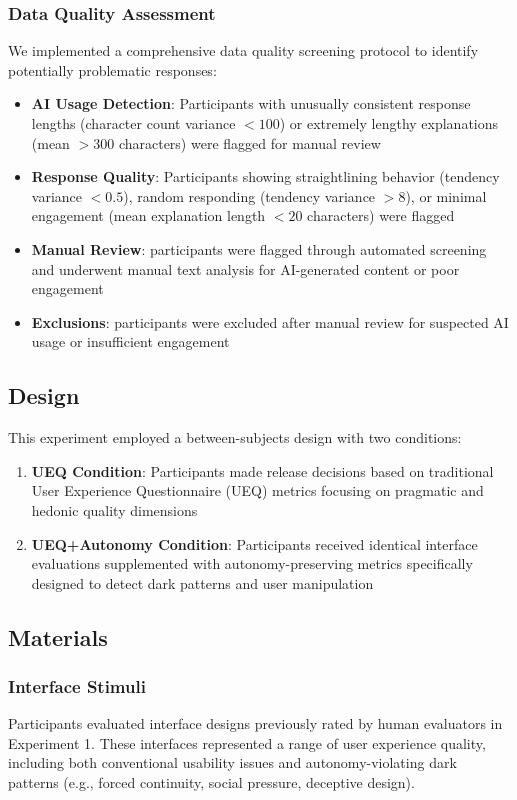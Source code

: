 \subsubsection{Data Quality Assessment}
We implemented a comprehensive data quality screening protocol to identify potentially problematic responses:

\begin{itemize}
    \item \textbf{AI Usage Detection}: Participants with unusually consistent response lengths (character count variance $< 100$) or extremely lengthy explanations (mean $> 300$ characters) were flagged for manual review
    \item \textbf{Response Quality}: Participants showing straightlining behavior (tendency variance $< 0.5$), random responding (tendency variance $> 8$), or minimal engagement (mean explanation length $< 20$ characters) were flagged
    \item \textbf{Manual Review}: \texttt{} participants were flagged through automated screening and underwent manual text analysis for AI-generated content or poor engagement
    \item \textbf{Exclusions}: \texttt{} participants were excluded after manual review for suspected AI usage or insufficient engagement
\end{itemize}

\subsection{Design}
This experiment employed a between-subjects design with two conditions:
\begin{enumerate}
    \item \textbf{UEQ Condition}: Participants made release decisions based on traditional User Experience Questionnaire (UEQ) metrics focusing on pragmatic and hedonic quality dimensions
    \item \textbf{UEQ+Autonomy Condition}: Participants received identical interface evaluations supplemented with autonomy-preserving metrics specifically designed to detect dark patterns and user manipulation
\end{enumerate}

\subsection{Materials}
\subsubsection{Interface Stimuli}
Participants evaluated \texttt{} interface designs previously rated by human evaluators in Experiment 1. These interfaces represented a range of user experience quality, including both conventional usability issues and autonomy-violating dark patterns (e.g., forced continuity, social pressure, deceptive design).

